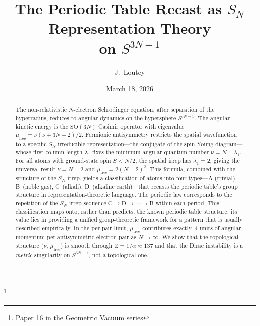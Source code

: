 \documentclass[aps,prl,twocolumn,superscriptaddress,longbibliography]{revtex4-2}
\newcommand{\mufree}{\mu_{\mathrm{free}}}
\begin{document}
\title{The Periodic Table Recast as $S_N$ Representation Theory\\
on $S^{3N-1}$}
\thanks{Paper 16 in the Geometric Vacuum series}

\author{J.~Loutey}

\date{March 18, 2026}


\begin{abstract}
The non-relativistic $N$-electron Schr\"odinger equation, after
separation of the hyperradius, reduces to angular dynamics on the
hypersphere $S^{3N-1}$.  The angular kinetic energy is the
$\mathrm{SO}(3N)$ Casimir operator with eigenvalue
$\mufree = \nu(\nu + 3N - 2)/2$.  Fermionic antisymmetry restricts
the spatial wavefunction to a specific $S_N$ irreducible
representation---the conjugate of the spin Young diagram---whose
first-column length $\lambda_1$ fixes the minimum angular quantum
number $\nu = N - \lambda_1$.  For all atoms with ground-state spin
$S < N/2$, the spatial irrep has $\lambda_1 = 2$, giving the
universal result $\nu = N - 2$ and $\mufree = 2(N-2)^2$.  This
formula, combined with the structure of the $S_N$ irrep, yields a
classification of atoms into four types---A (trivial), B~(noble gas),
C~(alkali), D~(alkaline earth)---that recasts the periodic table's
group structure in representation-theoretic language.  The periodic law
corresponds to the repetition of the $S_N$ irrep sequence
$\mathrm{C} \to \mathrm{D} \to \cdots \to \mathrm{B}$ within each
period.  This classification maps onto, rather than predicts, the
known periodic table structure; its value lies in providing a
unified group-theoretic framework for a pattern that is usually
described empirically.  In the per-pair limit, $\mufree$
contributes exactly~4 units of angular momentum per antisymmetric
electron pair as $N \to \infty$.  We show that the topological
structure ($\nu$, $\mufree$) is smooth through $Z = 1/\alpha \approx
137$ and that the Dirac instability is a \emph{metric} singularity on
$S^{3N-1}$, not a topological one.
\end{abstract}

\maketitle

\end{document}
